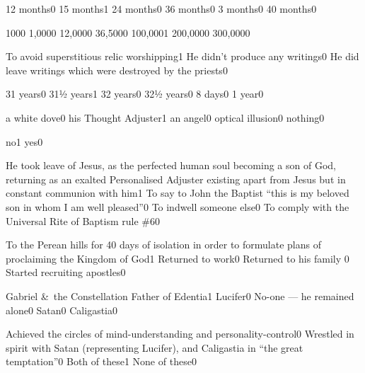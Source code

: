 {12 months}{0}
{15 months}{1}
{24 months}{0}
{36 months}{0}
{3 months}{0}
{40 months}{0}
\qstop

{100}{0}
{1,000}{0}
{12,000}{0}
{36,500}{0}
{100,000}{1}
{200,000}{0}
{300,000}{0}
\qstop


{To avoid superstitious relic worshipping}{1}
{He didn't produce any writings}{0}
{He did leave writings which were destroyed by the priests}{0}
\qstop

{31 years}{0}
{31½ years}{1}
{32 years}{0}
{32½ years}{0}
{8 days}{0}
{1 year}{0}
\qstop

{a white dove}{0}
{his Thought Adjuster}{1}
{an angel}{0}
{optical illusion}{0}
{nothing}{0}
\qstop

{no}{1}
{yes}{0}
\qstop

{He took leave of Jesus, as the perfected human soul becoming a son of God, returning as an exalted Personalised Adjuster existing apart from Jesus but in constant communion with him}{1}
{To say to John the Baptist ``this is my beloved son in whom I am well pleased''}{0}
{To indwell someone else}{0}
{To comply with the Universal Rite of Baptism rule \#6}{0}
\qstop

{To the Perean hills for 40 days of isolation in order to formulate plans of proclaiming the Kingdom of God}{1}
{Returned to work}{0}
{Returned to his family }{0}
{Started recruiting apostles}{0}
\qstop

{Gabriel \&\ the Constellation Father of Edentia}{1}
{Lucifer}{0}
{No-one --- he remained alone}{0}
{Satan}{0}
{Caligastia}{0}
\qstop

{Achieved the circles of mind-understanding and per\-so\-na\-li\-ty\hyp{}control}{0}
{Wrestled in spirit with Satan (representing Lucifer), and Caligastia in ``the great temptation''}{0}
{Both of these}{1}
{None of these}{0}
\qstop

